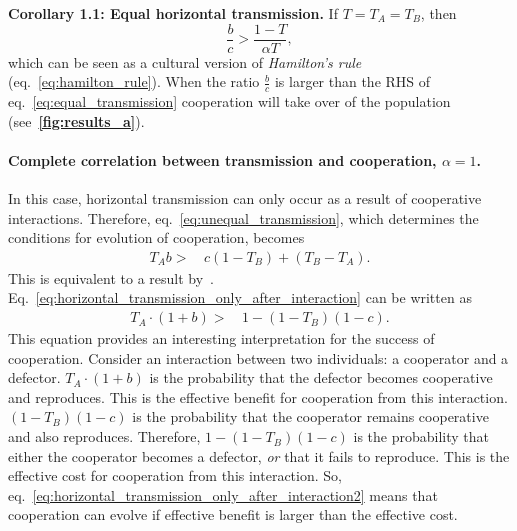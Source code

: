 \documentclass[12pt]{extarticle}
\begin{document}
\textbf{Corollary 1.1: Equal horizontal transmission.}
If $T=T_A=T_B$, then
\begin{equation}
\label{eq:equal_transmission}
\frac{b}{c} > \frac{1-T}{\alpha T},
\end{equation}
which can be seen as a cultural version of \emph{Hamilton's rule} (eq.~\ref{eq:hamilton_rule}).
When the ratio $\frac{b}{c}$ is larger than the RHS of eq.~\ref{eq:equal_transmission} cooperation will take over of the population (see~\textbf{\autoref{fig:results_a}}).

\paragraph*{Complete correlation between transmission and cooperation, $\alpha=1$.}
	
In this case, horizontal transmission can only occur as a result of cooperative interactions.
Therefore, eq.~\ref{eq:unequal_transmission}, which determines the conditions for evolution of cooperation, becomes
\begin{equation} 
\begin{split} \label{eq:horizontal_transmission_only_after_interaction}
T_A b > \,& c (1-T_B) + (T_B - T_A).
\end{split}
\end{equation}
This is equivalent to a result by~\citet[eq.~1]{lewin2017microbes}.
Eq.~\ref{eq:horizontal_transmission_only_after_interaction} can be written as
\begin{equation} 
\begin{split} \label{eq:horizontal_transmission_only_after_interaction2}
T_A\cdot(1+b) > \,& 1 - (1-T_B)(1-c).
\end{split}
\end{equation}
This equation provides an interesting interpretation for the success of cooperation. 
Consider an interaction between two individuals: a cooperator and a defector.
$T_A\cdot(1+b)$ is the probability that the defector becomes cooperative and reproduces.
This is the effective benefit for cooperation from this interaction.
$(1-T_B)(1-c)$ is the probability that the cooperator remains cooperative and also reproduces. 
Therefore, $1 - (1-T_B)(1-c)$ is the probability that either the cooperator becomes a defector, \emph{or} that it fails to reproduce.
This is the effective cost for cooperation from this interaction.
So, eq.~\ref{eq:horizontal_transmission_only_after_interaction2} means that cooperation can evolve if effective benefit is larger than the effective cost.
\end{document}
